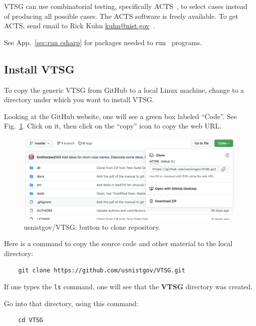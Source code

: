 VTSG can use combinatorial testing, specifically ACTS~\cite{ACTS2013}, to select
cases instead of producing all possible cases.  The ACTS software is freely available.
To get ACTS, send email to Rick Kuhn
\href{mailto:kuhn@nist.gov}{kuhn@nist.gov}~\cite{CombinTesting}.

See App.~\ref{sec:run csharp} for packages needed to run \CSharp\ programs.

\subsection{Install VTSG}

\noindent To copy the generic VTSG from GitHub to a local Linux machine, change to a
directory under which you want to install VTSG.

\noindent Looking at the GitHub website, one will see a green box labeled ``Code''.
See Fig.~\ref{fig:clone button}.
Click on it, then click on the ``copy'' icon to copy the web URL.

\begin{figure}[htbp]
  \includegraphics[width=1\linewidth]{fig_clone_tab.png}
  \caption{usnistgov/VTSG: button to clone repository.}
  \label{fig:clone button}
\end{figure}

\noindent Here is a command to copy the source code and other material to the local
directory:

\begin{verbatim}
    git clone https://github.com/usnistgov/VTSG.git
\end{verbatim}

\noindent If one types the \verb|ls| command, one will see that the \textbf{VTSG}
directory was created.

\noindent Go into that directory, using this command:

\begin{verbatim}
    cd VTSG
\end{verbatim}

